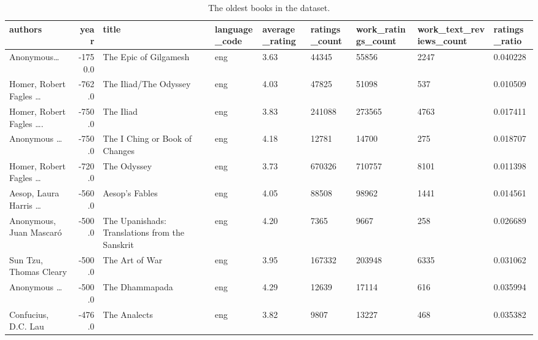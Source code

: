 \documentclass[11pt]{article}
\begin{document}
\begin{table}
\begin{tabular}{lrlHHHHHZ}
\toprule
                                           authors &  year &                                           title & language\_code &  average\_rating &  ratings\_count &  work\_ratings\_count &  work\_text\_reviews\_count &  ratings\_ratio \\
\midrule
                           Anonymous\ldots &                    -1750.0 &                           The Epic of Gilgamesh &           eng &            3.63 &          44345 &               55856 &                     2247 &       0.040228 \\
                Homer, Robert Fagles \ldots &                     -762.0 &                           The Iliad/The Odyssey &           eng &            4.03 &          47825 &               51098 &                      537 &       0.010509 \\
 Homer, Robert Fagles \ldots. &                     -750.0 &                                       The Iliad &           eng &            3.83 &         241088 &              273565 &                     4763 &       0.017411 \\
 Anonymous \ldots &                     -750.0 &                  The I Ching or Book of Changes &           eng &            4.18 &          12781 &               14700 &                      275 &       0.018707 \\
 Homer, Robert Fagles  \ldots &                     -720.0 &                                     The Odyssey &           eng &            3.73 &         670326 &              710757 &                     8101 &       0.011398 \\
                  Aesop, Laura Harris \ldots &                     -560.0 &                                  Aesop's Fables &           eng &            4.05 &          88508 &               98962 &                     1441 &       0.014561 \\
                           Anonymous, Juan Mascar\'o &                     -500.0 &  The Upanishads: Translations from the Sanskrit &           eng &            4.20 &           7365 &                9667 &                      258 &       0.026689 \\
                            Sun Tzu, Thomas Cleary &                     -500.0 &                                  The Art of War &           eng &            3.95 &         167332 &              203948 &                     6335 &       0.031062 \\
 Anonymous \ldots &                     -500.0 &                                  The Dhammapada &           eng &            4.29 &          12639 &               17114 &                      616 &       0.035994 \\
                               Confucius, D.C. Lau &                     -476.0 &                                    The Analects &           eng &            3.82 &           9807 &               13227 &                      468 &       0.035382 \\
\bottomrule
\end{tabular}
    \caption[Oldest Books]{The oldest books in the dataset.}
     \label{tbl:oldest-books}
\end{table}
\end{document}
